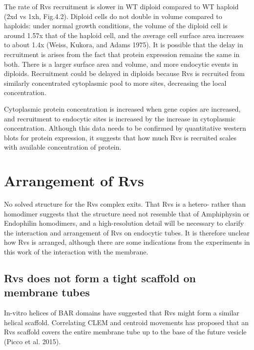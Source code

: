 	\vspace{5mm}
The rate of Rvs recruitment is slower in WT diploid compared to WT haploid (2xd vs 1xh, Fig.4.2). Diploid cells do not double in volume compared to haploids: under normal growth conditions, the volume of the diploid cell is around 1.57x that of the haploid cell, and the average cell surface area increases to  about 1.4x (Weiss, Kukora, and Adams 1975). It is possible that the delay in recruitment is arises from the fact that protein expression remains the same in both. There is a larger surface area and volume, and more endocytic events in diploids. Recruitment could be delayed in diploids because Rvs is recruited from similarly concentrated cytoplasmic pool to more sites, decreasing the local concentration.

	\vspace{5mm}
Cytoplasmic protein concentration is increased when gene copies are increased, and recruitment to endocytic sites is increased by the increase in cytoplasmic concentration. Although this data needs to be confirmed by quantitative western blots for protein expression, it suggests that how much Rvs is recruited scales with available concentration of protein. 



\section{Arrangement of Rvs}
No solved structure for the Rvs complex exits. That Rvs is a hetero- rather than homodimer suggests that the structure need not resemble that of Amphiphysin or Endophilin homodimers, and a high-resolution detail will be necessary to clarify the interaction and arrangement of Rvs on endocytic tubes. It is therefore unclear how Rvs is arranged, although there are some indications from the experiments in this work of the interaction with the membrane.


\subsection{Rvs does not form a tight scaffold on membrane tubes}
In-vitro helices of BAR domains have suggested that Rvs might form a similar helical scaffold. Correlating CLEM and centroid movements has proposed that an Rvs scaffold covers the entire membrane tube up to the base of the future vesicle (Picco et al. 2015). 

